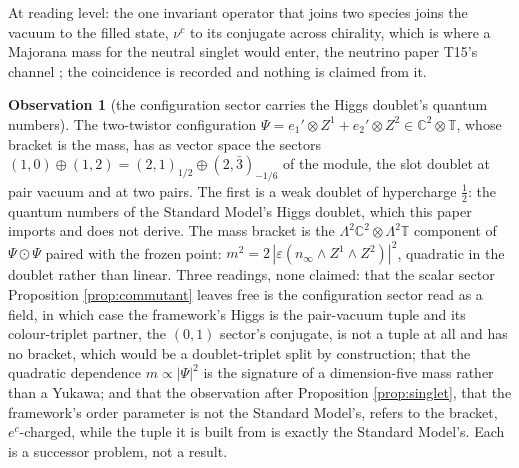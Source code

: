 \documentclass[11pt]{article}
\theoremstyle{definition}
\newtheorem{observation}[theorem]{Observation}
\newcommand{\C}{\mathbb{C}}
\newcommand{\T}{\mathbb{T}}
\begin{document}
At reading level: the one invariant operator that joins two species joins the vacuum to the filled state, $\nu^{c}$ to its conjugate across chirality, which is where a Majorana mass for the neutral singlet would enter, the neutrino paper T15's channel \cite{ButlerT15}; the coincidence is recorded and nothing is claimed from it.

\begin{observation}[the configuration sector carries the Higgs doublet's quantum numbers]\label{obs:higgs}
The two-twistor configuration $\Psi = e_{1}' \otimes Z^{1} + e_{2}' \otimes Z^{2} \in \C^{2} \otimes \T$, whose bracket is the mass, has as vector space the sectors $(1,0) \oplus (1,2) = (2,1)_{1/2} \oplus (2,\bar{3})_{-1/6}$ of the module, the slot doublet at pair vacuum and at two pairs. The first is a weak doublet of hypercharge $\tfrac12$: the quantum numbers of the Standard Model's Higgs doublet, which this paper imports and does not derive. The mass bracket is the $\Lambda^{2}\C^{2} \otimes \Lambda^{2}\T$ component of $\Psi \odot \Psi$ paired with the frozen point: $m^{2} = 2\,|\varepsilon(n_{\infty} \wedge Z^{1} \wedge Z^{2})|^{2}$, quadratic in the doublet rather than linear. Three readings, none claimed: that the scalar sector Proposition \ref{prop:commutant} leaves free is the configuration sector read as a field, in which case the framework's Higgs is the pair-vacuum tuple and its colour-triplet partner, the $(0,1)$ sector's conjugate, is not a tuple at all and has no bracket, which would be a doublet-triplet split by construction; that the quadratic dependence $m \propto |\Psi|^{2}$ is the signature of a dimension-five mass rather than a Yukawa; and that the observation after Proposition \ref{prop:singlet}, that the framework's order parameter is not the Standard Model's, refers to the bracket, $e^{c}$-charged, while the tuple it is built from is exactly the Standard Model's. Each is a successor problem, not a result.
\end{observation}
\end{document}
